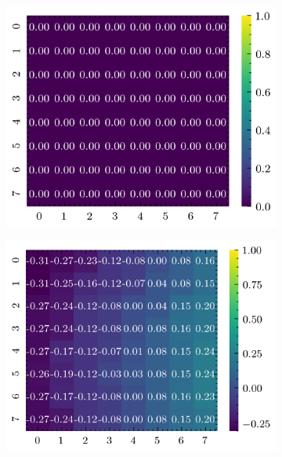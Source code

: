 \documentclass[../document.tex]{subfiles}
\begin{document}
\begin{figure}[H]
\begin{subfigure}[b]{0.19\textwidth}
        \includegraphics[width=\linewidth]{../img/5/quarry/best/heatmap-2d-2.png}
    \end{subfigure}
    \begin{subfigure}[b]{0.19\textwidth}
        \includegraphics[width=\linewidth]{../img/5/quarry/best/heatmap-2d-3.png}
    \end{subfigure}  
    \begin{subfigure}[b]{0.19\textwidth}

\end{subfigure}
\end{figure}
\end{document}
